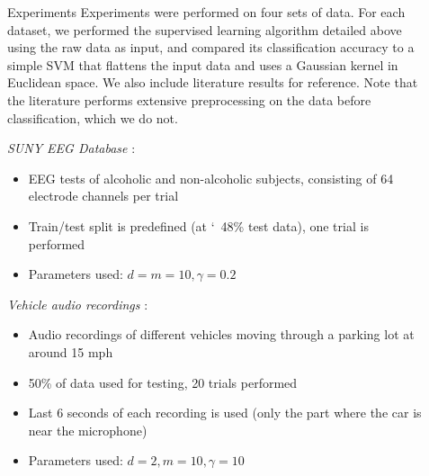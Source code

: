 \documentclass[final]{beamer}
\newlength{\sepwid}
\newlength{\onecolwid}
\newcommand{\lbr}{\vspace{0.5in}}
\begin{document}
\begin{frame}[t]
\begin{columns}[t]
\begin{column}{\onecolwid}
\end{column} %

\begin{column}{\sepwid}\end{column} %

\begin{column}{\onecolwid} %


\begin{block}{Experiments}
    Experiments were performed on four sets of data. For each dataset, we performed the supervised
    learning algorithm detailed above using the raw data as input, and compared its classification
    accuracy to a simple SVM that flattens the input data and uses a Gaussian kernel in Euclidean
    space. We also include literature results for reference. Note that the literature performs
    extensive preprocessing on the data before classification, which we do not. \lbr

    \textit{SUNY EEG Database} \cite{zhang_event_1995}:
    \begin{itemize}
        \item EEG tests of alcoholic and non-alcoholic subjects, consisting of 64 electrode channels
            per trial
        \item Train/test split is predefined (at \char`~48\% test data), one trial is performed
        \item Parameters used: $d = m = 10, \gamma = 0.2$
    \end{itemize}

    \textit{Vehicle audio recordings} \cite{sunu_dimensionality_2018}:
    \begin{itemize}
        \item Audio recordings of different vehicles moving through a parking lot at around 15 mph
        \item 50\% of data used for testing, 20 trials performed
        \item Last 6 seconds of each recording is used (only the part where the car is near the
            microphone)
        \item Parameters used: $d = 2, m = 10, \gamma = 10$
    \end{itemize}


\end{block}
\end{column}
\end{columns}
\end{frame}
\end{document}
